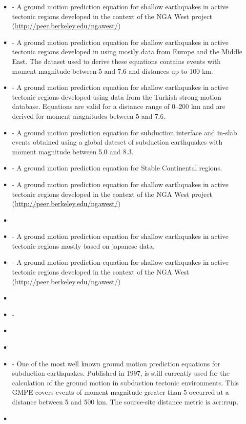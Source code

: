 \label{sec:gmpes_list}
\begin{itemize} 
    \item \cite{abrahamson2008} - A ground motion prediction equation 
    for shallow earthquakes in active tectonic regions developed in 
    the context of the NGA West project
    (\href{http://peer.berkeley.edu/ngawest/}{http://peer.berkeley.edu/ngawest/})
    \item \cite{akkar2010} - A ground motion prediction equation 
    for shallow earthquakes in active tectonic regions developed in 
    using mostly data from Europe and the Middle East. The dataset 
    used to derive these equations contains events with moment 
    magnitude between 5 and 7.6 and distances up to 100 km.
    \item \cite{akkar2010a} - A ground motion prediction equation for shallow
    earthquakes in active tectonic regions developed using data from the 
    Turkish strong-motion database. Equations are valid for a distance 
    range of 0–200 km and are derived for moment magnitudes 
    between 5 and 7.6.
    \item \cite{atkinson2003} - A ground motion prediction equation for 
    subduction interface and in-slab events obtained using a global 
    dateset of subduction earthquakes with moment magnitude between 
    5.0 and 8.3.
    \item \cite{atkinson2006} - A ground motion prediction equation for 
    Stable Continental regions.
    \item \cite{boore2008} - A ground motion prediction equation 
    for shallow earthquakes in active tectonic regions developed in 
    the context of the NGA West project 
    	(\href{http://peer.berkeley.edu/ngawest/}
		{http://peer.berkeley.edu/ngawest/})
    \item \cite{campbell2003}
    \item \cite{cauzzi2008} - A ground motion prediction equation 
    	for shallow earthquakes in active tectonic regions mostly based 
    	on japanese data.
    \item \cite{chiou2008} - A ground motion prediction equation 
    	for shallow earthquakes in active tectonic regions developed in 
    	the context of the NGA West
    	(\href{http://peer.berkeley.edu/ngawest/}
		{http://peer.berkeley.edu/ngawest/})
    \item \cite{faccioli2010}
    \item \cite{lin2008} - 
    \item \cite{sadigh1997}
    \item \cite{toro2002}
    \item \cite{youngs1997} - One of the most well known ground motion 
		prediction equations for subduction earthquakes. Published in 1997,
		is still currently used for the calculation of the ground motion 
		in subduction tectonic environments. This GMPE covers events of 
		moment magnitude greater than 5 occurred at a distance between 5
		and 500 km. The source-site distance metric is \gls{acr:rrup}.
    \item \cite{zhao2006} 
\end{itemize}
